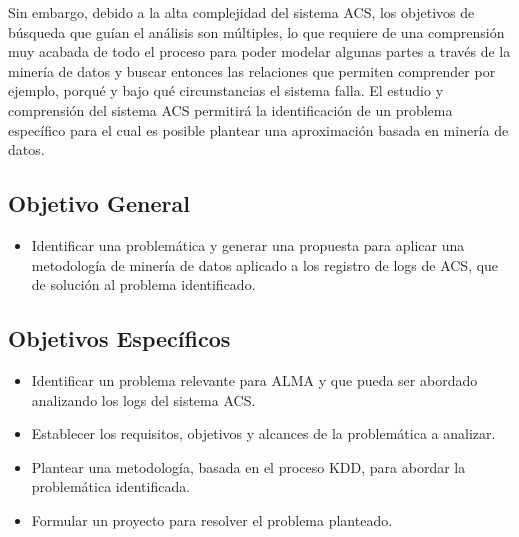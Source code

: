 Sin embargo, debido a la alta complejidad del sistema ACS, los objetivos de búsqueda que guían el análisis son múltiples, lo que requiere de una comprensión muy acabada de todo el proceso para poder modelar algunas partes a través de la minería de datos y buscar entonces las relaciones que permiten comprender por ejemplo, porqué y bajo qué circunstancias el sistema falla. El estudio y comprensión del sistema ACS permitirá la identificación de un problema específico para el cual es posible plantear una aproximación basada en minería de datos.



\newpage

 
\subsection{Objetivo General}

\begin{itemize}
	\item Identificar una problemática y generar una propuesta para aplicar una metodología de minería de datos aplicado a los registro de logs de ACS, que de solución al problema identificado.
\end{itemize}


\subsection{Objetivos Específicos}
\begin{itemize}	
	\item Identificar un problema relevante para ALMA y que pueda ser abordado analizando los logs del sistema ACS.
	\item Establecer los requisitos, objetivos y alcances de la problemática a analizar.
	\item Plantear una metodología, basada en el proceso KDD, para abordar la problemática identificada.
	\item Formular un proyecto para resolver el problema planteado.
\end{itemize}



